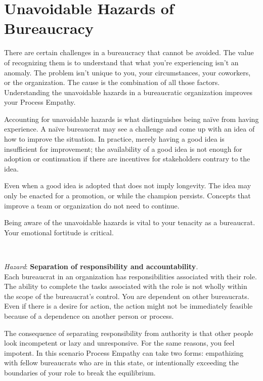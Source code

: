 \section{Unavoidable Hazards of Bureaucracy\label{sec:unavoidable-hazards}}



There are certain challenges in a bureaucracy that cannot be avoided. The value of recognizing them is to understand that what you're experiencing isn't an anomaly. The problem isn't unique to you, your circumstances, your coworkers, or the organization. The cause is the combination of all those factors.
Understanding the unavoidable hazards in a bureaucratic organization improves your Process Empathy. 

Accounting for unavoidable hazards is what distinguishes being na\"ive from having experience. A na\"ive bureaucrat may see a challenge and come up with an idea of how to improve the situation. In practice, merely having a good idea is insufficient for improvement; the availability of a good idea is not enough for adoption or continuation if there are incentives for stakeholders contrary to the idea. 

Even when a good idea is adopted that does not imply longevity. The idea may only be enacted for a promotion, or while the champion persists. Concepts that improve a team or organization do not need to continue. 

Being aware of the unavoidable hazards is vital to your tenacity as a bureaucrat. Your emotional fortitude is critical. 


\ \\
\begin{samepage}
\textit{Hazard}: \textbf{Separation of responsibility and accountability}. \\
Each bureaucrat in an organization has responsibilities associated with their role. The ability to complete the tasks associated with the role is not wholly within the scope of the bureaucrat's control. You are dependent on other bureaucrats. Even if there is a desire for action, the action might not be immediately feasible because of a dependence on another person or process. 

The consequence of separating responsibility from authority is that other people look incompetent or lazy and unresponsive. For the same reasons, you feel impotent. In this scenario Process Empathy can take two forms: empathizing with fellow bureaucrats who are in this state, or intentionally exceeding the boundaries of your role to break the equilibrium. 
\end{samepage}

